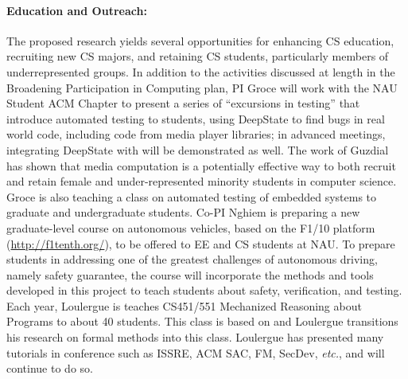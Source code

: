 \paragraph{Education and Outreach:}
The proposed research yields several opportunities for enhancing CS
education, recruiting new CS majors, and retaining CS students,
particularly members of underrepresented groups.  In addition to the
activities discussed at length in the Broadening Participation in Computing plan,
PI Groce will work with the NAU Student ACM Chapter to present a
series of ``excursions in testing'' that introduce automated testing
to students, using DeepState to find bugs in real world code, including code from
media player libraries; in advanced meetings, integrating DeepState
with \framac will be demonstrated as well.  The work of Guzdial
\cite{Guzdial} has shown that media computation is a
potentially effective way to both recruit and retain female and
under-represented minority students in computer science. Groce is also teaching a
class on automated testing of embedded systems to graduate and
undergraduate students.
Co-PI Nghiem is preparing a new graduate-level course on autonomous
vehicles, based on the F1/10 platform (\url{http://f1tenth.org/}), to be offered to EE and CS students at NAU.
To prepare students in addressing one of the greatest challenges of autonomous driving, namely safety guarantee, the course will incorporate the methods and tools developed in this project to teach students about safety, verification, and testing.
Each year, Loulergue is teaches CS451/551 Mechanized Reasoning about Programs to about 40 students.
This class is based on \framac and Loulergue transitions his research on formal methods into this class.
Loulergue has presented many \framac tutorials in conference such as ISSRE, ACM SAC, FM, SecDev, {\it etc.}, and will continue to do so.

